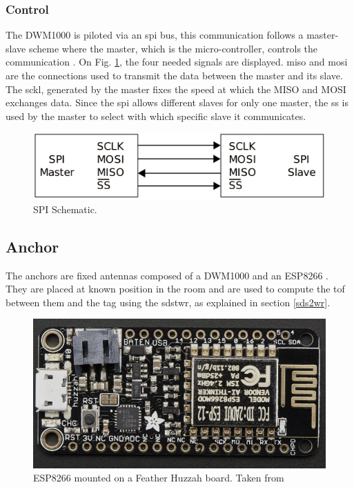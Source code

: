 \subsubsection{Control}

The DWM1000 is piloted via an \gls{spi} bus, this communication follows a master-slave scheme where the master, which is the micro-controller, controls the communication \cite{busspi}. On Fig. \ref{fig:spi_scheme}, the four needed signals are displayed. \gls{miso} and \gls{mosi} are the connections used to transmit the data between the master and its slave. The \gls{sckl}, generated by the master fixes the speed at which the MISO and MOSI exchanges data. Since the \gls{spi} allows different slaves for only one master, the \gls{ss} is used by the master to select with which specific slave it communicates. 

\begin{figure}[H]
	\centering
	\includegraphics[width=.6\linewidth]{Images/SPI_scheme.png}
	\caption{SPI Schematic.}
	\label{fig:spi_scheme}
\end{figure}

\subsection{Anchor}

The anchors are fixed antennas composed of a DWM1000 and an ESP8266 \cite{esp8266}. They are placed at known position in the room and are used to compute the \gls{tof} between them and the tag using the \gls{sdstwr}, as explained in section \ref{sds2wr}. 

\begin{figure}[H]
	\centering
	\includegraphics[width=.6\linewidth]{Images/esp8266.png}
	\caption{ESP8266 mounted on a Feather Huzzah board. Taken from \cite{adafruit}}
	\label{fig:esp8266}
\end{figure}


